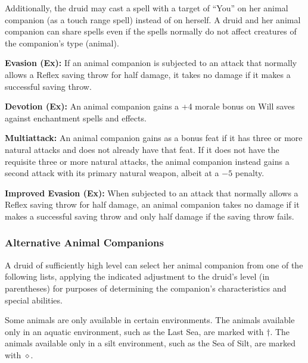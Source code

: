 Additionally, the druid may cast a spell with a target of ``You'' on her animal companion (as a touch range spell) instead of on herself. A druid and her animal companion can share spells even if the spells normally do not affect creatures of the companion's type (animal).

\textbf{Evasion (Ex):} If an animal companion is subjected to an attack that normally allows a Reflex saving throw for half damage, it takes no damage if it makes a successful saving throw.

\textbf{Devotion (Ex):} An animal companion gains a +4 morale bonus on Will saves against enchantment spells and effects.

\textbf{Multiattack:} An animal companion gains  as a bonus feat if it has three or more natural attacks and does not already have that feat. If it does not have the requisite three or more natural attacks, the animal companion instead gains a second attack with its primary natural weapon, albeit at a $-5$ penalty.

\textbf{Improved Evasion (Ex):} When subjected to an attack that normally allows a Reflex saving throw for half damage, an animal companion takes no damage if it makes a successful saving throw and only half damage if the saving throw fails.

\subsubsection{Alternative Animal Companions}
A druid of sufficiently high level can select her animal companion from one of the following lists, applying the indicated adjustment to the druid's level (in parentheses) for purposes of determining the companion's characteristics and special abilities.

Some animals are only available in certain environments. The animals available only in an aquatic environment, such as the Last Sea, are marked with $\dagger$. The animals available only in a silt environment, such as the Sea of Silt, are marked with $\diamond$.


